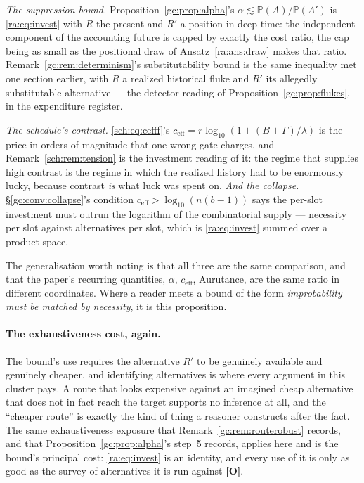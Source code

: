 \documentclass[11pt]{article}
\numberwithin{equation}{section}
\theoremstyle{plain}
\theoremstyle{definition}
\theoremstyle{remark}
\newcommand{\PP}{\mathbb{P}}
\begin{document}
\emph{The suppression bound.} Proposition~\ref{gc:prop:alpha}'s
$\alpha\lesssim\PP(A)/\PP(A')$ is \eqref{ra:eq:invest} with $R$ the
present and $R'$ a position in deep time: the independent component of
the accounting future is capped by exactly the cost ratio, the cap
being as small as the positional draw of Ansatz~\ref{ra:ans:draw}
makes that ratio. Remark~\ref{gc:rem:determinism}'s substitutability
bound is the same inequality met one section earlier, with $R$ a
realized historical fluke and $R'$ its allegedly substitutable
alternative --- the detector reading of
Proposition~\ref{gc:prop:flukes}, in the expenditure register.

\emph{The schedule's contrast.} \eqref{sch:eq:cefff}'s
$c_{\mathrm{eff}}=r\log_{10}(1+(B+\Gamma)/\lambda)$ is the price in
orders of magnitude that one wrong gate charges, and
Remark~\ref{sch:rem:tension} is the investment reading of it: the regime
that supplies high contrast is the regime in which the realized history
had to be enormously lucky, because contrast \emph{is} what luck was
spent on. \emph{And the collapse.} \S\ref{gc:conv:collapse}'s condition
$c_{\mathrm{eff}}>\log_{10}(n(b-1))$ says the per-slot investment must
outrun the logarithm of the combinatorial supply --- necessity per slot
against alternatives per slot, which is \eqref{ra:eq:invest} summed over
a product space.

The generalisation worth noting is that all three are the same
comparison, and that the paper's recurring quantities, $\alpha$,
$c_{\mathrm{eff}}$, Aurutance, are the same ratio in different
coordinates. Where a reader meets a bound of the form \emph{improbability
must be matched by necessity}, it is this proposition.

\paragraph{The exhaustiveness cost, again.}\label{ra:rem:investcost}
The bound's use requires the alternative $R'$ to be genuinely available
and genuinely cheaper, and identifying alternatives is where every
argument in this cluster pays. A route that looks expensive against an
imagined cheap alternative that does not in fact reach the target
supports no inference at all, and the ``cheaper route'' is exactly the
kind of thing a reasoner constructs after the fact. The same
exhaustiveness exposure that Remark~\ref{gc:rem:routerobust} records, and
that Proposition~\ref{gc:prop:alpha}'s step~5 records, applies here and is
the bound's principal cost: \eqref{ra:eq:invest} is an identity, and
every use of it is only as good as the survey of alternatives it is run
against \textbf{[O]}.
\end{document}
